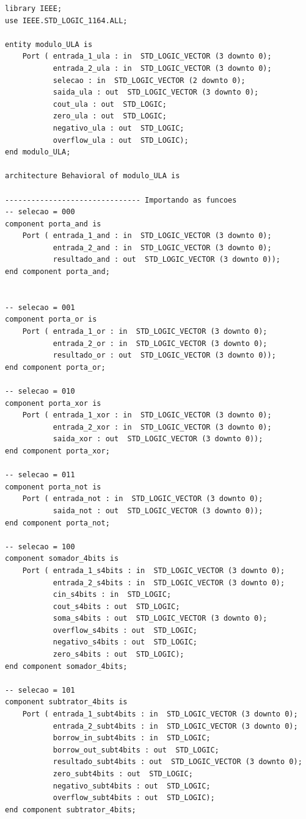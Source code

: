 \documentclass[a4paper,12pt,twoside]{article}
\begin{document}
\begin{lstlisting}
library IEEE;
use IEEE.STD_LOGIC_1164.ALL;

entity modulo_ULA is
    Port ( entrada_1_ula : in  STD_LOGIC_VECTOR (3 downto 0);
           entrada_2_ula : in  STD_LOGIC_VECTOR (3 downto 0);
           selecao : in  STD_LOGIC_VECTOR (2 downto 0);
           saida_ula : out  STD_LOGIC_VECTOR (3 downto 0);
           cout_ula : out  STD_LOGIC;
           zero_ula : out  STD_LOGIC;
           negativo_ula : out  STD_LOGIC;
           overflow_ula : out  STD_LOGIC);
end modulo_ULA;

architecture Behavioral of modulo_ULA is

------------------------------- Importando as funcoes
-- selecao = 000
component porta_and is
    Port ( entrada_1_and : in  STD_LOGIC_VECTOR (3 downto 0);
           entrada_2_and : in  STD_LOGIC_VECTOR (3 downto 0);
           resultado_and : out  STD_LOGIC_VECTOR (3 downto 0));
end component porta_and;


-- selecao = 001
component porta_or is
    Port ( entrada_1_or : in  STD_LOGIC_VECTOR (3 downto 0);
           entrada_2_or : in  STD_LOGIC_VECTOR (3 downto 0);
           resultado_or : out  STD_LOGIC_VECTOR (3 downto 0));
end component porta_or;

-- selecao = 010
component porta_xor is
    Port ( entrada_1_xor : in  STD_LOGIC_VECTOR (3 downto 0);
           entrada_2_xor : in  STD_LOGIC_VECTOR (3 downto 0);
           saida_xor : out  STD_LOGIC_VECTOR (3 downto 0));
end component porta_xor;

-- selecao = 011
component porta_not is
    Port ( entrada_not : in  STD_LOGIC_VECTOR (3 downto 0);
           saida_not : out  STD_LOGIC_VECTOR (3 downto 0));
end component porta_not;

-- selecao = 100
component somador_4bits is
    Port ( entrada_1_s4bits : in  STD_LOGIC_VECTOR (3 downto 0);
           entrada_2_s4bits : in  STD_LOGIC_VECTOR (3 downto 0);
           cin_s4bits : in  STD_LOGIC;
           cout_s4bits : out  STD_LOGIC;
           soma_s4bits : out  STD_LOGIC_VECTOR (3 downto 0);
           overflow_s4bits : out  STD_LOGIC;
           negativo_s4bits : out  STD_LOGIC;
           zero_s4bits : out  STD_LOGIC);
end component somador_4bits;

-- selecao = 101
component subtrator_4bits is
    Port ( entrada_1_subt4bits : in  STD_LOGIC_VECTOR (3 downto 0);
           entrada_2_subt4bits : in  STD_LOGIC_VECTOR (3 downto 0);
           borrow_in_subt4bits : in  STD_LOGIC;
           borrow_out_subt4bits : out  STD_LOGIC;
           resultado_subt4bits : out  STD_LOGIC_VECTOR (3 downto 0);
           zero_subt4bits : out  STD_LOGIC;
           negativo_subt4bits : out  STD_LOGIC;
           overflow_subt4bits : out  STD_LOGIC);
end component subtrator_4bits;



\end{lstlisting}
\end{document}
